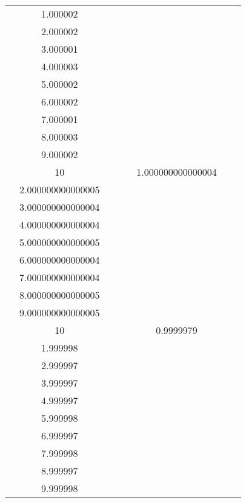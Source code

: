 \documentclass[oneside, final, 12pt]{extarticle}
\begin{document}
\begin{longtable}{|c|c|c|c|c|c|c|}
\begin{aligned}
& 1.000002 \\ & 2.000002 \\ & 3.000001 \\ & 4.000003 \\ & 5.000002 \\ & 6.000002 \\ & 7.000001 \\ & 8.000003 \\ & 9.000002 \\ & 10 
\end{aligned} \)
& \( \begin{aligned}  \end{aligned} \) 
& \( \begin{aligned}
& 1.000000000000004 \\ & 2.000000000000005 \\ & 3.000000000000004 \\ & 4.000000000000004 \\ & 5.000000000000005 \\ & 6.000000000000004 \\ & 7.000000000000004 \\ & 8.000000000000005 \\ & 9.000000000000005 \\ & 10 
\end{aligned} \)
& \( \begin{aligned}  \end{aligned} \) 
& \( \begin{aligned}
& 0.9999979 \\ & 1.999998 \\ & 2.999997 \\ & 3.999997 \\ & 4.999997 \\ & 5.999998 \\ & 6.999997 \\ & 7.999998 \\ & 8.999997 \\ & 9.999998 
\end{aligned} \)
& \( \begin{aligned}  \end{aligned} \) 
\\ \hline
\end{longtable}
\end{document}
